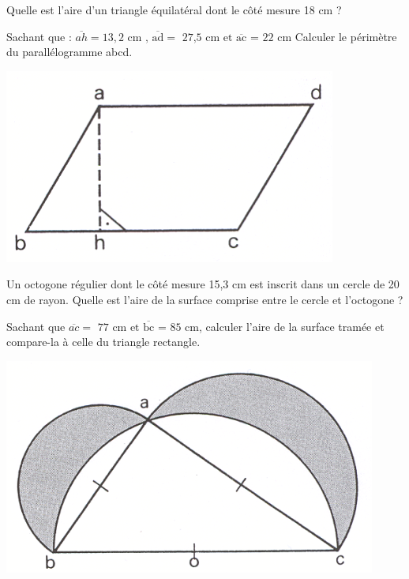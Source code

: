 \begin{exercice}
Quelle est l'aire d'un triangle équilatéral dont le côté mesure 18 cm ?


\end{exercice}

\begin{exercice}
Sachant que : $\overline{ah}=13,2\text{ cm , }\overline{\text{ad}}=\text{ 27,5 cm et }\overline{\text{ac}}\text{ = 22 cm}$
Calculer le périmètre du parallélogramme abcd.
\begin{center}
\includegraphics[width = 0.4 \textwidth]{triangle/image/pyth14.png}
\end{center}
\end{exercice}

\begin{exercice}
Un octogone régulier dont le côté mesure 15,3 cm est inscrit dans un cercle de 20 cm de rayon.
Quelle est l'aire de la surface comprise entre le cercle et l'octogone ?


\end{exercice}

\begin{exercice}
Sachant que $\overline{ac}=\text{ 77 cm et }\overline{\text{bc}}\text{ = 85 cm}$,
calculer l'aire de la surface tramée et compare-la à celle du triangle rectangle.
\begin{center}
\includegraphics[width = 0.4 \textwidth]{triangle/image/pyth16.png}
\end{center}
\end{exercice}

